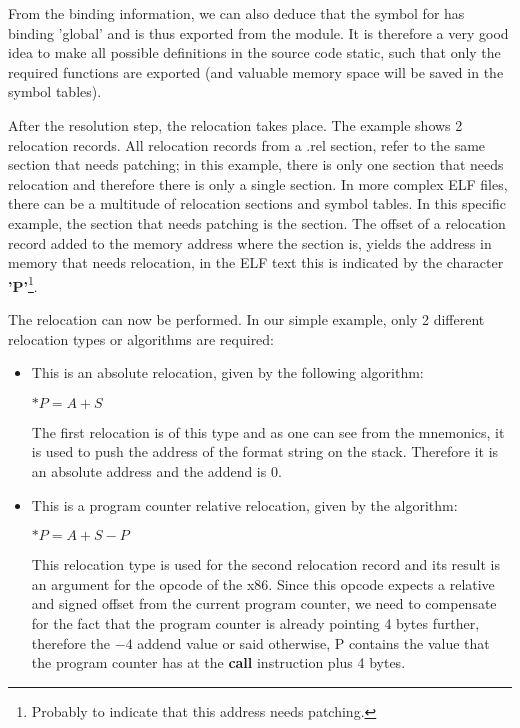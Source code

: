 From the binding information, we can also deduce that the symbol for
 has binding 'global' and is thus exported from the module. It
is therefore a very good idea to make all possible definitions in the source
code static, such that only the required functions are exported (and
valuable memory space will be saved in the symbol tables).

After the resolution step, the relocation takes place. The example shows 2
relocation records. All relocation records from a .rel section, refer to the same
section that needs patching; in this example, there is only one section that
needs relocation and therefore there is only a single  section.
In more complex ELF files, there can be a multitude of relocation sections
and symbol tables. In this specific example, the section that needs patching
is the  section. The offset of a relocation record added to
the memory address where the section is, yields the address in memory that
needs relocation, in the ELF text this is indicated by the character
\textbf{'P'}\footnote{Probably to indicate that this address needs
patching.}.

The relocation can now be performed. In our simple example, only 2 different
relocation types or algorithms are required:

\begin{itemize}
\item {} This is an absolute relocation, given by the
following algorithm:

$*P = A + S$

The first relocation is of this type and as one can see from the mnemonics,
it is used to push the address of the format string on the stack. Therefore
it is an absolute address and the addend is 0.

\item {} This is a program counter relative relocation,
given by the algorithm:

$*P = A + S - P$

This relocation type is used for the second relocation record and its result
is an argument for the  opcode of the x86. Since this
opcode expects a relative and signed offset from the current
program counter, we need to compensate for the fact that the program counter
is already pointing 4 bytes further, therefore the $-4$ addend value or
said otherwise, P contains the value that the program counter has at the \textbf{call} instruction
plus 4 bytes.
\end{itemize}

